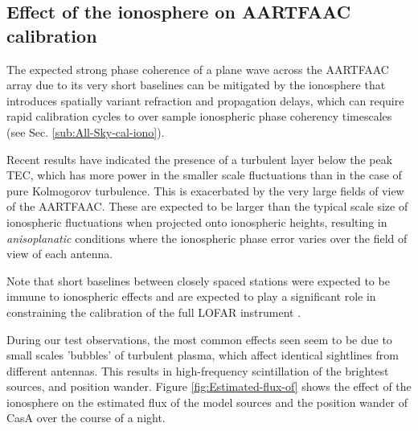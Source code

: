 \documentclass{aa}
\begin{document}
\subsection{\label{sub:iono-effect-on-calib}Effect of the ionosphere on AARTFAAC
calibration}

The expected  strong phase coherence of  a plane wave across  the AARTFAAC array
due  to  its very  short  baselines  can be  mitigated  by  the ionosphere  that
introduces  spatially  variant  refraction  and propagation  delays,  which  can
require  rapid calibration  cycles to  over sample  ionospheric  phase coherency
timescales (see Sec. \ref{sub:All-Sky-cal-iono}).

Recent results \citep{intema2009ionospheric} have indicated the  presence
of a  turbulent layer below  the peak  TEC, which has  more power in  the smaller
scale  fluctuations than in  the case  of pure  Kolmogorov turbulence.   This is
exacerbated by the very large fields  of view of the \mbox{AARTFAAC}.  These are
expected to  be larger than the  typical scale size  of ionospheric fluctuations
when  projected  onto  ionospheric  heights,  resulting  in  \emph{anisoplanatic
}conditions where the  ionospheric phase error varies over the  field of view of
each antenna.

Note that  short baselines between closely  spaced stations were  expected to be
immune to  ionospheric effects and are  expected to play a  significant role in
constraining    the     calibration    of    the     full    LOFAR    instrument
\citep{vdTol2007selfcallofar}.

During our  test observations, the  most common effects  seen seem to be  due to
small scales  'bubbles' of turbulent  plasma, which affect  identical sightlines
from different  antennas.  This results  in high-frequency scintillation  of the
brightest  sources,  and  position wander.   Figure  \ref{fig:Estimated-flux-of}
shows the  effect of the ionosphere on  the estimated flux of  the model sources
and the position wander of CasA over the course of a night.
\end{document}
